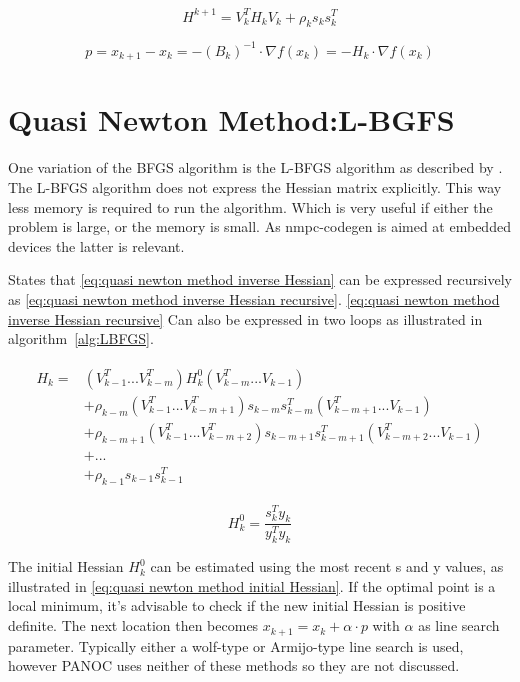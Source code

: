 		\begin{equation}
			H^{k+1} = V_k^TH_kV_k + \rho_ks_ks_k^T
			\label{eq:quasi newton method inverse Hessian}	
		\end{equation}
		
		\begin{equation}
		p = x_{k+1}-x_k = -(B_k)^{-1} \cdot \nabla f(x_k) = -H_k\cdot \nabla f(x_k)
		\label{eq:quasi newton method}	
		\end{equation}
		
	\section{Quasi Newton Method:L-BGFS}
	One variation of the BFGS algorithm is the L-BFGS algorithm as described by \cite{Wright}. The L-BFGS algorithm does not express the Hessian matrix explicitly. This way less memory is required to run the algorithm. Which is very useful if either the problem is large, or the memory is small. As nmpc-codegen is aimed at embedded devices the latter is relevant.
	
	\cite{Wright} States that \eqref{eq:quasi newton method inverse Hessian} can be expressed recursively as \eqref{eq:quasi newton method inverse Hessian recursive}. \eqref{eq:quasi newton method inverse Hessian recursive} Can also be expressed in two loops as illustrated in algorithm~\ref{alg:LBFGS}.
	
		\begin{eqnarray}	 
			\begin{aligned}
				H_k = 
				& (V^T_{k-1} ... V^T_{k-m})H^0_k(V^T_{k-m} ... V_{k-1}) \\
				& + \rho_{k-m} (V^T_{k-1} ... V^T_{k-m+1})s_{k-m}s_{k-m}^T(V^T_{k-m+1} ... V_{k-1}) \\
				& + \rho_{k-m+1} (V^T_{k-1} ... V^T_{k-m+2})s_{k-m+1}s_{k-m+1}^T(V^T_{k-m+2} ... V_{k-1}) \\
				& + ... \\
				& + \rho_{k-1}s_{k-1}s_{k-1}^T
			\end{aligned}
			\label{eq:quasi newton method inverse Hessian recursive}
		\end{eqnarray}
		
		\begin{equation}
			H_k^0 = \frac{s_k^Ty_k}{y_k^Ty_k}
			\label{eq:quasi newton method initial Hessian}
		\end{equation}
		
	The initial Hessian $H^0_k$ can be estimated using the most recent s and y values, as illustrated in \eqref{eq:quasi newton method initial Hessian}. If the optimal point is a local minimum, it's advisable to check if the new initial Hessian is positive definite. The next location then becomes $x_{k+1} = x_{k}+ \alpha \cdot p$ with $\alpha$ as line search parameter. Typically either a wolf-type or Armijo-type line search is used, however PANOC uses neither of these methods so they are not discussed.
	
